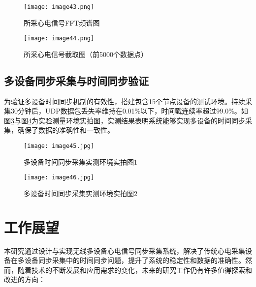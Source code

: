 \begin{figure}[htb]
    \centering
    \texttt{[image: image43.png]}
    \caption{所采心电信号FFT频谱图}
    \label{F.ECG_image43}
\end{figure}

\begin{figure}[H]
    \centering
    \texttt{[image: image44.png]}
    \caption{所采心电信号截取图（前5000个数据点）}
    \label{F.ECG_image44}
\end{figure}

\subsection{多设备同步采集与时间同步验证}

为验证多设备时间同步机制的有效性，搭建包含15个节点设备的测试环境。持续采集30分钟后，UDP数据包丢失率维持在0.01\%以下，时间戳连续率超过99.0\%。如图\ref{F.ECG_image45}与图\ref{F.ECG_image46}为实验测量环境实拍图，实测结果表明系统能够实现多设备的时间同步采集，确保了数据的准确性和一致性。

\begin{figure}[htb]
    \centering
    \texttt{[image: image45.jpg]}
    \caption{多设备时间同步采集实测环境实拍图1}
    \label{F.ECG_image45}
\end{figure}

\begin{figure}[htb]
    \centering
    \texttt{[image: image46.jpg]}
    \caption{多设备时间同步采集实测环境实拍图2}
    \label{F.ECG_image46}
\end{figure}



\section{工作展望}

本研究通过设计与实现无线多设备心电信号同步采集系统，解决了传统心电采集设备在多设备同步采集中的时间同步问题，提升了系统的稳定性和数据的准确性。然而，随着技术的不断发展和应用需求的变化，未来的研究工作仍有许多值得探索和改进的方向：

